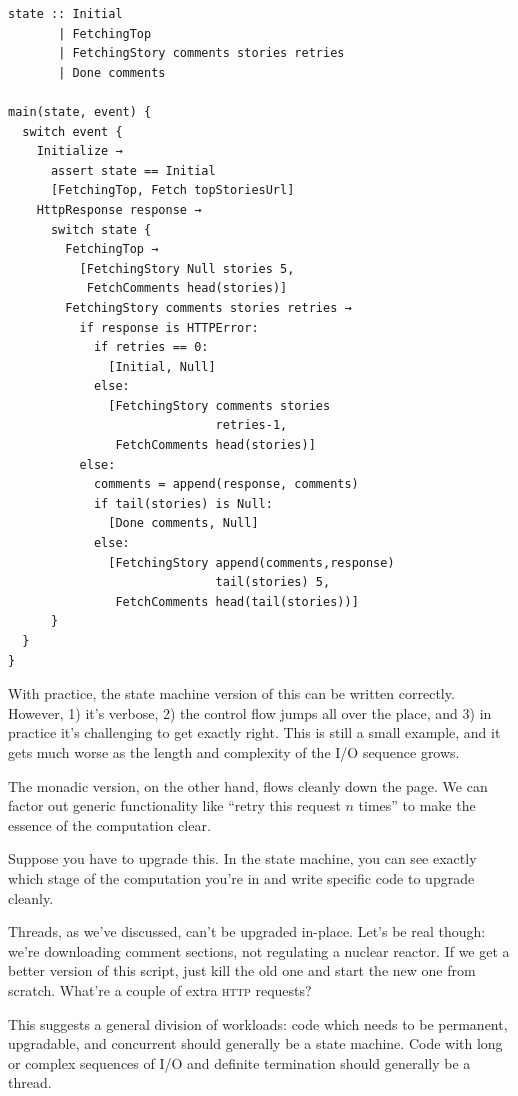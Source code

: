 \documentclass[twoside]{article}
\begin{document}
\begin{lstlisting}[style=listingblock,
                   float=p!,
                   label={lst:state-machine},
                   caption={State machine example of fetching top stories and comments.},]
state :: Initial
       | FetchingTop
       | FetchingStory comments stories retries
       | Done comments

main(state, event) {
  switch event {
    Initialize →
      assert state == Initial
      [FetchingTop, Fetch topStoriesUrl]
    HttpResponse response →
      switch state {
        FetchingTop →
          [FetchingStory Null stories 5,
           FetchComments head(stories)]
        FetchingStory comments stories retries →
          if response is HTTPError:
            if retries == 0:
              [Initial, Null]
            else:
              [FetchingStory comments stories
                             retries-1,
               FetchComments head(stories)]
          else:
            comments = append(response, comments)
            if tail(stories) is Null:
              [Done comments, Null]
            else:
              [FetchingStory append(comments,response)
                             tail(stories) 5,
               FetchComments head(tail(stories))]
      }
  }
}
\end{lstlisting}

With practice, the state machine version of this can be written
correctly. However, 1) it's verbose, 2) the control flow jumps all
over the place, and 3) in practice it's challenging to get exactly
right. This is still a small example, and it gets much worse as the
length and complexity of the I/O sequence grows.

The monadic version, on the other hand, flows cleanly down the page. We
can factor out generic functionality like ``retry this request $n$ times''
to make the essence of the computation clear.

Suppose you have to upgrade this. In the state machine, you can see
exactly which stage of the computation you're in and write specific code
to upgrade cleanly.

Threads, as we've discussed, can't be upgraded in-place. Let's be real
though: we're downloading comment sections, not regulating a nuclear
reactor. If we get a better version of this script, just kill the old
one and start the new one from scratch. What're a couple of extra \textsc{http}
requests?

This suggests a general division of workloads: code which needs to be
permanent, upgradable, and concurrent should generally be a state
machine. Code with long or complex sequences of I/O and definite
termination should generally be a thread.
\end{document}
